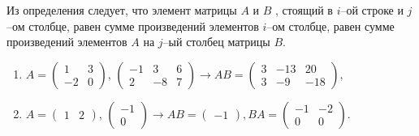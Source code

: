 Из определения следует, что элемент матрицы $A$ и $B$ , стоящий в $i$–ой строке и $j$–ом столбце, равен сумме произведений элементов $i$–ом столбце, равен сумме произведений элементов $A$ на $j$–ый столбец матрицы $B$.
\begin{example}
  \begin{enumerate} $\\$
    \item $A= \begin{pmatrix}
      1& 3\\
      -2& 0
    \end{pmatrix}$, $\begin{pmatrix}
      -1& 3& 6\\
      2& -8& 7
    \end{pmatrix} \rightarrow AB=\begin{pmatrix}
      3& -13& 20\\
      3& -9& -18
    \end{pmatrix}$,
    \item $A= \begin{pmatrix}
      1& 2
    \end{pmatrix}$, $\begin{pmatrix}
      -1\\
      0
    \end{pmatrix} \rightarrow AB=\begin{pmatrix}
      -1
    \end{pmatrix} , BA=\begin{pmatrix}
      -1& -2\\
      0& 0
    \end{pmatrix}$.
  \end{enumerate}
\end{example}

